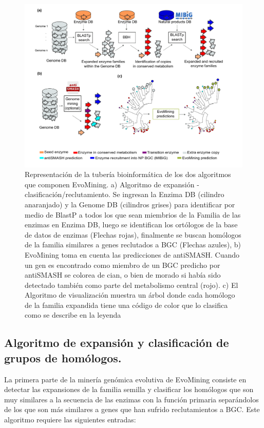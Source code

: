 \documentclass[12pt,twoside]{reedthesis}
\begin{document}
  \begin{figure}[h!tbp]
  \centering
  \includegraphics[angle = 0,scale = .8]{chapter2/FigurasPaper/Figure1.pdf}
  \caption[EvoMining Algorithm]{\footnotesize{Representación de la tubería bioinformática de los dos algoritmos que componen EvoMining. a) Algoritmo de expansión - clasificación/reclutamiento. Se ingresan la Enzima DB (cilindro anaranjado) y la Genome DB (cilindros grises) para identificar por medio de BlastP a todos los que sean miembrios de la Familia de las enzimas en Enzima DB, luego se identifican los ortólogos de la base de datos de enzimas (Flechas rojas), finalmente se buscan homólogos de la familia similares a genes reclutados a BGC (Flechas azules),  b) EvoMining toma en cuenta las predicciones de antiSMASH. Cuando un  gen es encontrado como miembro de un BGC predicho por antiSMASH se colorea de cian, o bien de morado si había sido detectado también como parte del metabolismo central (rojo). c) El Algoritmo de visualización muestra un árbol donde cada homólogo de la familia expandida tiene una código de color que lo clasifica como se describe en la leyenda}}
  \label{fig:EvoMiningAlgorithms}
  \end{figure}
  
  \subsection{Algoritmo de expansión y clasificación de grupos de
  homólogos.}\label{algoritmo-de-expansion-y-clasificacion-de-grupos-de-homologos.}
  
  La primera parte de la minería genómica evolutiva de EvoMining consiste
  en detectar las expansiones de la familia semilla y clasificar los
  homólogos que son muy similares a la secuencia de las enzimas con la
  función primaria separándolos de los que son más similares a genes que
  han sufrido reclutamientos a BGC. Este algoritmo requiere las siguientes
  entradas:
  
\end{document}
